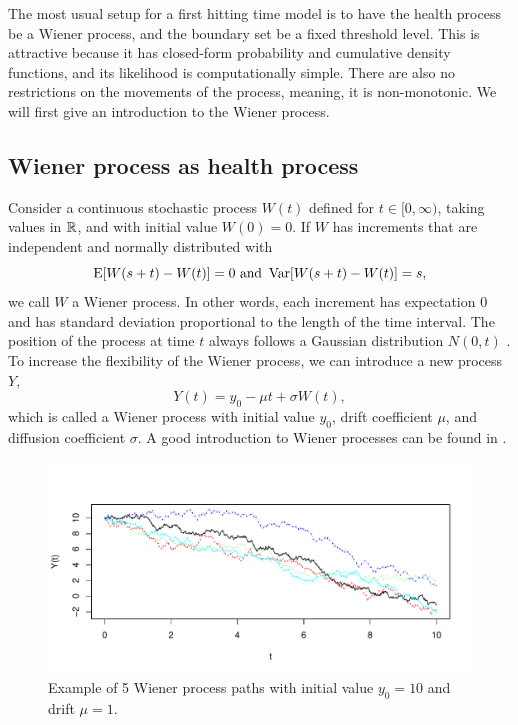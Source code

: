The most usual setup for a first hitting time model is to have the health process be a Wiener process, and the boundary set be a fixed threshold level.
This is attractive because it has closed-form probability and cumulative density functions, and its likelihood is computationally simple. 
There are also no restrictions on the movements of the process, meaning, it is non-monotonic.
We will first give an introduction to the Wiener process.

\subsection{Wiener process as health process}
Consider a continuous stochastic process $W(t)$ defined for $t\in[0,\infty)$, taking values in $\mathbb{R}$, and with initial value $W(0)=0$. If $W$ has increments that are independent and normally distributed with
\begin{equation*}
    \operatorname{E}[W(s+t)-W(t)]=0\text{   and   }\operatorname{Var}[W(s+t)-W(t)]=s,
\end{equation*}
we call $W$ a Wiener process. In other words, each increment has expectation 0 and has standard deviation proportional to the length of the time interval. The position of the process at time $t$ always follows a Gaussian distribution $N(0, t)$ \citep{ABG}. To increase the flexibility of the Wiener process, we can introduce a new process $Y$,
\begin{equation}\label{wiener}
    Y(t)=y_0-\mu t+\sigma W(t),
\end{equation}
which is called a Wiener process with initial value $y_0$, drift coefficient $\mu$, and diffusion coefficient $\sigma$. A good introduction to Wiener processes can be found in \citet{cox1965}.
\begin{figure}[H]
\label{plot:wiener}
\caption{Example of 5 Wiener process paths with initial value $y_0=10$ and drift $\mu=1$.}
\centering
\includegraphics[scale=0.4]{figures/wiener_processes.pdf}
\end{figure}
